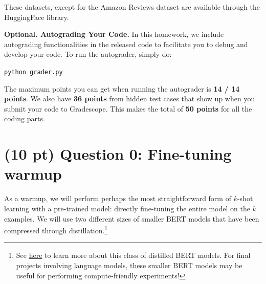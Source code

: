 \documentclass[12pt]{article}
\begin{document}
These datasets, except for the Amazon Reviews dataset are available through the HuggingFace library.

\vspace{0.2cm}
\noindent\textbf{Optional. Autograding Your Code.}
In this homework, we include autograding functionalities in the released code to facilitate you to debug and develop your code. To run the autograder, simply do:

\texttt{python grader.py}

\noindent The maximum points you can get when running the autograder is \textbf{14 / 14 points}. We also have \textbf{36 points} from hidden test cases that show up when you submit your code to Gradescope. This makes the total of \textbf{50 points} for all the coding parts.

\section*{(10 pt) Question 0: Fine-tuning warmup}
As a warmup, we will perform perhaps the most straightforward form of $k$-shot learning with a pre-trained model: directly fine-tuning the entire model on the $k$ examples. We will use two different sizes of smaller BERT models that have been compressed through distillation.\footnote{See \href{https://arxiv.org/pdf/1908.08962.pdf}{here} to learn more about this class of distilled BERT models. For final projects involving language models, these smaller BERT models may be useful for performing compute-friendly experiments!}
\end{document}
